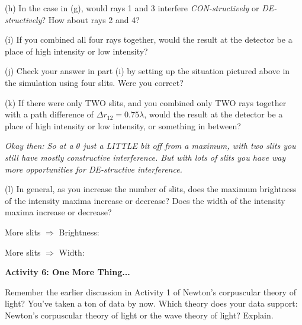 (h) In the case in (g), would rays 1 and 3 interfere \textit{CON-structively} or \textit{DE-structively}?  How about rays 2 and 4?
\answerspace{0.5in}

(i) If you combined all four rays together, would the result at the detector be a place of high intensity or low intensity? 
\answerspace{0.3in}

(j) Check your answer in part (i) by setting up the situation pictured above in the simulation using four slits.  Were you correct?
\answerspace{0.2in}


(k) If there were only TWO slits, and you combined only TWO rays together with a path difference of $\Delta r_{12} = 0.75\lambda$, would the result at the detector be a place of high intensity or low intensity, or something in between? 
\answerspace{0.4in}

\textit{Okay then: So at a $\theta$ just a LITTLE bit off from a maximum, with two slits you still have mostly constructive interference.  But with lots of slits you have way more opportunities for DE-structive interference.}

(l) In general, as you increase the number of slits, does the maximum brightness of the intensity maxima increase or decrease? Does the width of the intensity maxima increase or decrease?


\medskip
\hspace{0.5in} More slits $\Longrightarrow$ Brightness:
\medskip

\hspace{0.5in} More slits $\Longrightarrow$ Width:
\medskip


\textbf{Activity 6: One More Thing...}

Remember the earlier discussion in Activity 1 of Newton's corpuscular theory of
light? You've taken a ton of data by now.  Which theory does your data support: Newton's corpuscular theory of light or the wave theory of light?
Explain.
\answerspace{\fill}
